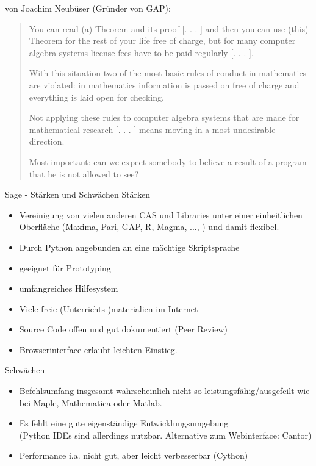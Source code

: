 \documentclass[hyperref={xetex}]{beamer}
\begin{document}
\begin{frame}{}
von Joachim Neubüser (Gründer von GAP):
 \begin{small}
\begin{quote}
    \alert{You can read (a) Theorem and its proof [. . . ] and then
    you can use (this) Theorem for the rest of your life free of
    charge, but for many computer algebra systems license fees
    have to be paid regularly [. . . ]}.  

With this situation \alert{two of the most basic rules of conduct in
mathematics are violated: in mathematics information is
passed on free of charge and everything is laid open for
checking}. 

Not applying these rules to computer algebra
systems that are made for mathematical research [. . . ]
means moving in a most undesirable direction. 

Most important: can we expect somebody to believe a result of a
program that he is not allowed to see?  
\end{quote}
 \end{small}

\end{frame}




\begin{frame}[fragile]{Sage - Stärken und Schwächen}
\alert{Stärken}
\begin{itemize}
\item Vereinigung von vielen anderen CAS und Libraries unter einer einheitlichen Oberfläche (Maxima, Pari,
GAP, R, Magma, ..., ) und damit flexibel.
\item Durch Python angebunden an eine mächtige Skriptsprache
\item geeignet für Prototyping
\item umfangreiches Hilfesystem
\item Viele freie (Unterrichts-)materialien im Internet 
\item Source Code offen und gut dokumentiert (Peer Review)
\item Browserinterface erlaubt leichten Einstieg.
\end{itemize}
\pause
\alert{Schwächen}
\begin{itemize}
\item Befehlsumfang insgesamt wahrscheinlich nicht so leistungsfähig/ausgefeilt wie bei Maple, Mathematica oder Matlab.
\item Es fehlt eine gute eigenständige Entwicklungsumgebung\\(Python IDEs sind allerdings nutzbar. Alternative zum Webinterface: \alert{Cantor})
\item Performance i.a. nicht gut, aber leicht verbesserbar (Cython)
\end{itemize}
\end{frame}
\end{document}
